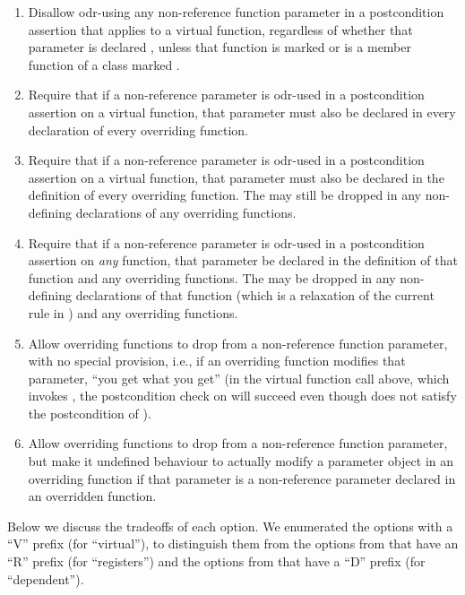 \renewcommand\labelenumi{V\arabic{enumi}.}
\renewcommand\theenumi\labelenumi
\begin{enumerate}
\item Disallow odr-using any non-reference function parameter in a postcondition assertion that applies to a virtual function, regardless of whether that parameter is declared , unless that function is marked  or is a member function of a class marked .
\item Require that if a non-reference parameter is odr-used in a postcondition assertion on a virtual function, that parameter must also be declared  in every declaration of every overriding function.
\item Require that if a non-reference parameter is odr-used in a postcondition assertion on a virtual function, that parameter must also be declared  in the definition of every overriding function. The  may still be dropped in any non-defining declarations of any overriding functions.
\item Require that if a non-reference parameter is odr-used in a postcondition assertion on \emph{any} function, that parameter be declared  in the definition of that function and any overriding functions. The  may be dropped in any non-defining declarations of that function (which is a relaxation of the current rule in \cite{P2900R10}) and any overriding functions.
\item Allow overriding functions to drop  from a non-reference function parameter, with no special provision, i.e., if an overriding function modifies that parameter, ``you get what you get'' (in the virtual function call above, which invokes , the postcondition check on  will succeed even though  does not satisfy the postcondition of ).
\item Allow overriding functions to drop  from a non-reference function parameter, but make it undefined behaviour to actually modify a parameter object in an overriding function if that parameter is a non-reference parameter declared  in an overridden function.
\end{enumerate}

Below we discuss the tradeoffs of each option. We enumerated the options with a ``V'' prefix (for ``virtual''), to distinguish them from the options from \cite{P3487R0} that have an ``R'' prefix (for ``registers'') and the options from \cite{P3489R0} that have a ``D'' prefix (for ``dependent'').

